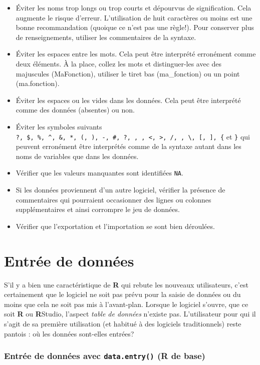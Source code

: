 \documentclass[
]{book}
\begin{document}
\begin{itemize}
\item
  Éviter les noms trop longs ou trop courts et dépourvus de signification. Cela augmente le risque d'erreur. L'utilisation de huit caractères ou moins est une bonne recommandation (quoique ce n'est pas une règle!). Pour conserver plus de renseignements, utiliser les commentaires de la syntaxe.
\item
  Éviter les espaces entre les mots. Cela peut être interprété erronément comme deux éléments. À la place, collez les mots et distinguer-les avec des majuscules (MaFonction), utiliser le tiret bas (ma\_fonction) ou un point (ma.fonction).
\item
  Éviter les espaces ou les vides dans les données. Cela peut être interprété comme des données (absentes) ou non.
\item
  Éviter les symboles suivants \texttt{?,\ \$,\ \%,\ \^{},\ \&,\ *,\ (,\ ),\ -,\ \#,\ ?,\ ,\ ,\ \textless{},\ \textgreater{},\ /,\ \textbar{},\ \textbackslash{},\ {[},\ {]},\ \{} et \texttt{\}} qui peuvent erronément être interprétés comme de la syntaxe autant dans les noms de variables que dans les données.
\item
  Vérifier que les valeurs manquantes sont identifiées \texttt{NA}.
\item
  Si les données proviennent d'un autre logiciel, vérifier la présence de commentaires qui pourraient occasionner des lignes ou colonnes supplémentaires et ainsi corrompre le jeu de données.
\item
  Vérifier que l'exportation et l'importation se sont bien déroulées.
\end{itemize}

\hypertarget{entruxe9e-de-donnuxe9es}{%
\chapter{Entrée de données}\label{entruxe9e-de-donnuxe9es}}

S'il y a bien une caractéristique de \textbf{R} qui rebute les nouveaux utilisateurs, c'est certainement que le logiciel ne soit pas prévu pour la saisie de données ou du moins que cela ne soit pas mis à l'avant-plan. Lorsque le logiciel s'ouvre, que ce soit \textbf{R} ou \textbf{R}Studio, l'aspect \emph{table de données} n'existe pas. L'utilisateur pour qui il s'agit de sa première utilisation (et habitué à des logiciels traditionnels) reste pantois : où les données sont-elles entrées?

\hypertarget{entruxe9e-de-donnuxe9es-avec-data.entry-r-de-base}{%
\subsection{\texorpdfstring{Entrée de données avec \texttt{data.entry()} (R de base)}{Entrée de données avec data.entry() (R de base)}}\label{entruxe9e-de-donnuxe9es-avec-data.entry-r-de-base}}
\end{document}
